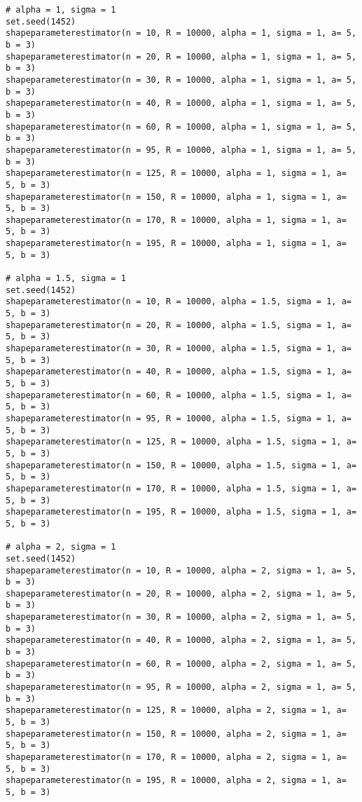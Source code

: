 \documentclass[a4paper,12pt]{report}
\begin{document}
{\begin{verbatim}
# alpha = 1, sigma = 1
set.seed(1452)
shapeparameterestimator(n = 10, R = 10000, alpha = 1, sigma = 1, a= 5, b = 3)
shapeparameterestimator(n = 20, R = 10000, alpha = 1, sigma = 1, a= 5, b = 3)
shapeparameterestimator(n = 30, R = 10000, alpha = 1, sigma = 1, a= 5, b = 3)
shapeparameterestimator(n = 40, R = 10000, alpha = 1, sigma = 1, a= 5, b = 3)
shapeparameterestimator(n = 60, R = 10000, alpha = 1, sigma = 1, a= 5, b = 3)
shapeparameterestimator(n = 95, R = 10000, alpha = 1, sigma = 1, a= 5, b = 3)
shapeparameterestimator(n = 125, R = 10000, alpha = 1, sigma = 1, a= 5, b = 3)
shapeparameterestimator(n = 150, R = 10000, alpha = 1, sigma = 1, a= 5, b = 3)
shapeparameterestimator(n = 170, R = 10000, alpha = 1, sigma = 1, a= 5, b = 3)
shapeparameterestimator(n = 195, R = 10000, alpha = 1, sigma = 1, a= 5, b = 3)

# alpha = 1.5, sigma = 1
set.seed(1452)
shapeparameterestimator(n = 10, R = 10000, alpha = 1.5, sigma = 1, a= 5, b = 3)
shapeparameterestimator(n = 20, R = 10000, alpha = 1.5, sigma = 1, a= 5, b = 3)
shapeparameterestimator(n = 30, R = 10000, alpha = 1.5, sigma = 1, a= 5, b = 3)
shapeparameterestimator(n = 40, R = 10000, alpha = 1.5, sigma = 1, a= 5, b = 3)
shapeparameterestimator(n = 60, R = 10000, alpha = 1.5, sigma = 1, a= 5, b = 3)
shapeparameterestimator(n = 95, R = 10000, alpha = 1.5, sigma = 1, a= 5, b = 3)
shapeparameterestimator(n = 125, R = 10000, alpha = 1.5, sigma = 1, a= 5, b = 3)
shapeparameterestimator(n = 150, R = 10000, alpha = 1.5, sigma = 1, a= 5, b = 3)
shapeparameterestimator(n = 170, R = 10000, alpha = 1.5, sigma = 1, a= 5, b = 3)
shapeparameterestimator(n = 195, R = 10000, alpha = 1.5, sigma = 1, a= 5, b = 3)

# alpha = 2, sigma = 1
set.seed(1452)
shapeparameterestimator(n = 10, R = 10000, alpha = 2, sigma = 1, a= 5, b = 3)
shapeparameterestimator(n = 20, R = 10000, alpha = 2, sigma = 1, a= 5, b = 3)
shapeparameterestimator(n = 30, R = 10000, alpha = 2, sigma = 1, a= 5, b = 3)
shapeparameterestimator(n = 40, R = 10000, alpha = 2, sigma = 1, a= 5, b = 3)
shapeparameterestimator(n = 60, R = 10000, alpha = 2, sigma = 1, a= 5, b = 3)
shapeparameterestimator(n = 95, R = 10000, alpha = 2, sigma = 1, a= 5, b = 3)
shapeparameterestimator(n = 125, R = 10000, alpha = 2, sigma = 1, a= 5, b = 3)
shapeparameterestimator(n = 150, R = 10000, alpha = 2, sigma = 1, a= 5, b = 3)
shapeparameterestimator(n = 170, R = 10000, alpha = 2, sigma = 1, a= 5, b = 3)
shapeparameterestimator(n = 195, R = 10000, alpha = 2, sigma = 1, a= 5, b = 3)


\end{verbatim}}
\end{document}
